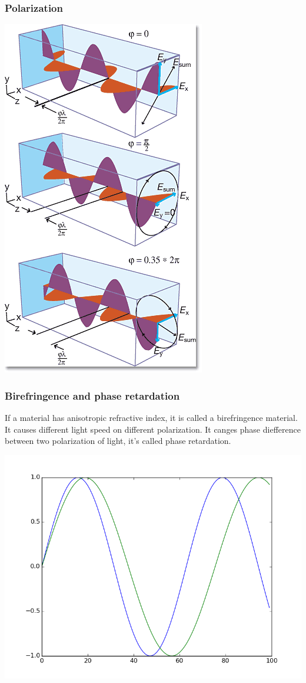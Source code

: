 \documentclass{beamer}
\begin{document}
\begin{frame}
\frametitle{Polarization}
\begin{center}
\includegraphics[scale=0.4]{polarization.png}
\end{center}
\end{frame}
\begin{frame}
\frametitle{Birefringence and phase retardation}
If a material has anisotropic refractive index, it is called a birefringence material. It causes different light speed on different polarization. It canges phase diefference between
two polarization of light, it's called phase retardation.
\begin{center}
\includegraphics[scale=0.4]{retardation.png}
\end{center}
\end{frame}
\end{document}
